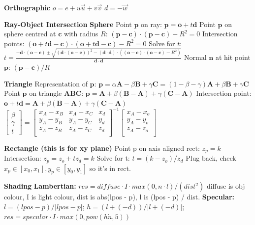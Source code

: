 \documentclass[letterpaper, 8pt]{extarticle}
\begin{document}
\begin{multicols*}{4}
\textbf{Orthographic}
$o = e + u \vec{u} + v \vec{v}$
$d = -\vec{w}$


\textbf{Ray-Object Intersection}
\textbf{Sphere}
Point $\mathbf{p}$ on ray: $\mathbf{p} = \mathbf{o} + t\mathbf{d}$
Point $\mathbf{p}$ on sphere centred at $\mathbf{c}$ with radius $R$: $(\mathbf{p} - \mathbf{c}) \cdot (\mathbf{p} - \mathbf{c}) - R^2 = 0$
Intersection points: $(\mathbf{o} + t\mathbf{d} - \mathbf{c}) \cdot (\mathbf{o} + t\mathbf{d} - \mathbf{c}) - R^2 = 0$
Solve for $t$:
$t = \frac{-\mathbf{d} \cdot (\mathbf{o} - \mathbf{c}) \pm \sqrt{(\mathbf{d} \cdot (\mathbf{o} - \mathbf{c}))^2 - (\mathbf{d} \cdot \mathbf{d}) \cdot ((\mathbf{o} - \mathbf{c}) \cdot (\mathbf{o} - \mathbf{c}) - R^2)}}{\mathbf{d} \cdot \mathbf{d}}$
Normal $\mathbf{n}$ at hit point $\mathbf{p}$:
$(\mathbf{p} - \mathbf{c}) / R$

\textbf{Triangle}
Representation of $\mathbf{p}$:
$\mathbf{p} = \alpha \mathbf{A} - \beta \mathbf{B} + \gamma \mathbf{C} = (1 - \beta - \gamma) \mathbf{A} + \beta \mathbf{B} + \gamma \mathbf{C}$
Point $\mathbf{p}$ on triangle $\mathbf{ABC}$:
$\mathbf{p}=\mathbf{A} + \beta (\mathbf{B} - \mathbf{A}) + \gamma(\mathbf{C} - \mathbf{A})$
Intersection point:
$\mathbf{o} + t \mathbf{d} = \mathbf{A} + \beta(\mathbf{B} - \mathbf{A}) + \gamma(\mathbf{C} - \mathbf{A})$
$
\begin{bmatrix}
    \beta \\ \gamma \\ t
\end{bmatrix}
=
\begin{bmatrix}
x_A - x_B & x_A - x_C & x_d \\
y_A - y_B & y_A - y_C & y_d \\
z_A - z_B & z_A - z_C & z_d \\
\end{bmatrix}^{-1}
\begin{bmatrix}
    x_A - x_o \\
    y_A - y_o \\
    z_A - z_o \\
\end{bmatrix}
$

\textbf{Rectangle (this is for xy plane)}
Point p on axis aligned rect: $z_p = k$
Intersection: $z_p = z_o + t z_d = k$
Solve for t: $t = (k - z_o) / z_d$
Plug back, check $x_p \in [x_0, x_1], y_p \in [y_0, y_1]$ so it's in rect.

\textbf{Shading}
\textbf{Lambertian:} $res = diffuse \cdot I \cdot max(0, n \cdot l) / (dist^2)$
diffuse is obj colour, I is light colour, dist is abs(lpos - p), l is (lpos - p) / dist.
\textbf{Specular:}
$l = (lpos - p) / |lpos - p|$;
$h = (l + (-d)) / |l + (-d)|$;
$res = specular \cdot I \cdot max(0, pow(h \dot n, 5))$


\end{multicols*}
\end{document}
